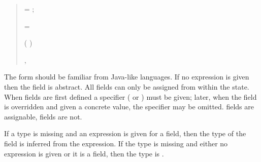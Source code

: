 \begin{quote}




 {}  =   ;


 {}

 {}


 {}   = 


 {}  

 {}  





 {}    (  )


 {}

 {}, 

 {}


 {}  


 {} 

\end{quote}

The  form should be familiar from Java-like
languages.  If no expression is given then the field is abstract.  All
fields can only be assigned from within the
state.
When fields are first defined a specifier ( or )
must be given; later, when the field is overridden and given a concrete
value, the specifier may be omitted.
 fields are assignable,  fields
are not.

If a type is missing and an expression is given for a
   field, then the type of the field is inferred from the
  expression.  If the type is missing and either no expression is
  given or it is a  field, then the type is .

